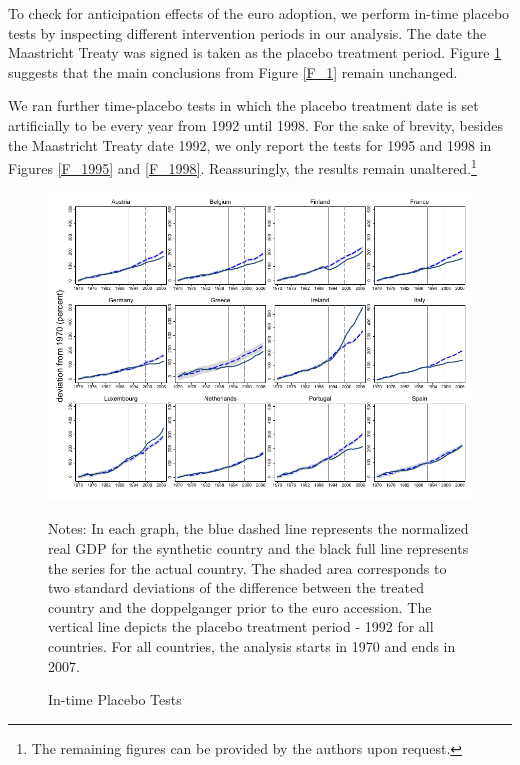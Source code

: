 \documentclass[12pt]{article}
\newcommand{\annote}[1]{\parbox{\textwidth}{\renewcommand{\baselinestretch}{1.0}\vspace{12pt} \small Notes: #1}}
\begin{document}
To check for anticipation effects of the euro adoption, we perform in-time placebo tests by inspecting different intervention periods in our analysis. The date the Maastricht Treaty was signed is taken as the placebo treatment period. Figure \ref{F_Maastricht} suggests that the main conclusions from Figure \ref{F_1} remain unchanged.

We ran further time-placebo tests in which the placebo treatment date is set artificially to be every year from 1992 until 1998. For the sake of brevity, besides the Maastricht Treaty date 1992, we only report the tests for 1995 and 1998 in Figures \ref{F_1995} and \ref{F_1998}. Reassuringly, the results remain unaltered.\footnote{The remaining figures can be provided by the authors upon request.}

\begin{figure}[h!]
    \centering
    \caption{In-time Placebo Tests}
    \includegraphics[scale=1.2]{Output/Figures/SCM_normgdp_s_Rob_1992_Annual.pdf}
    \annote{In each graph, the blue dashed line represents the normalized real GDP for the synthetic country and the black full line represents the series for the actual country. The shaded area corresponds to two standard deviations of the difference between the treated country and the doppelganger prior to the euro accession. The vertical line depicts the placebo treatment period - 1992 for all countries. For all countries, the analysis starts in 1970 and ends in 2007. %
    }
    \label{F_Maastricht}
\end{figure}
\end{document}
